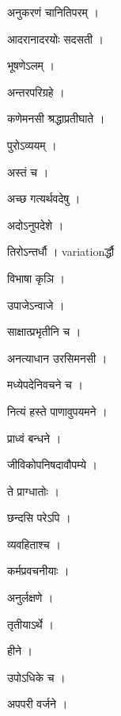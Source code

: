 \documentclass[10pt, openany]{book}
\begin{document}
\noindent अनुकरणं चानितिपरम् ।

\noindent आदरानादरयोः सदसती ।

\noindent भूषणेऽलम् ।

\noindent अन्तरपरिग्रहे ।

\noindent कणेमनसी श्रद्धाप्रतीघाते ।

\noindent पुरोऽव्ययम् ।

\noindent अस्तं च ।

\noindent अच्छ गत्यर्थवदेषु ।

\noindent अदोऽनुपदेशे ।

\noindent तिरोऽन्तर्धौ । variationर्द्धौ

\noindent विभाषा कृञि ।

\noindent उपाजेऽन्वाजे ।

\noindent साक्षात्प्रभृतीनि च ।

\noindent अनत्याधान उरसिमनसी ।

\noindent मध्येपदेनिवचने च ।

\noindent नित्यं हस्ते पाणावुपयमने ।

\noindent प्राध्वं बन्धने ।

\noindent जीविकोपनिषदावौपम्ये ।

\noindent ते प्राग्धातोः ।

\noindent छन्दसि परेऽपि ।

\noindent व्यवहिताश्च ।

\noindent कर्मप्रवचनीयाः ।

\noindent अनुर्लक्षणे ।

\noindent तृतीयाऽर्थे ।

\noindent हीने ।

\noindent उपोऽधिके च ।

\noindent अपपरी वर्जने ।
\end{document}
